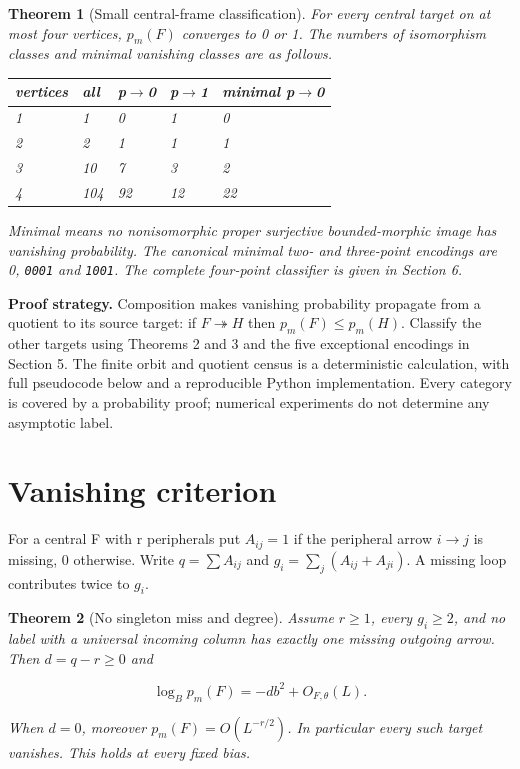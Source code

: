 \documentclass[11pt]{article}
\newtheorem{theorem}{Theorem}
\begin{document}
\begin{theorem}[Small central-frame classification]\label{thm:classification} For every central target on at most four vertices, $p_{m}(F)$ converges to 0 or 1. The numbers of isomorphism classes and minimal vanishing classes are as follows.

\begin{center}\small
\begin{tabular}{lllll}
\toprule
vertices & all & p\ensuremath{\to}0 & p\ensuremath{\to}1 & minimal p\ensuremath{\to}0\\
\midrule
1 & 1 & 0 & 1 & 0\\
2 & 2 & 1 & 1 & 1\\
3 & 10 & 7 & 3 & 2\\
4 & 104 & 92 & 12 & 22\\
\bottomrule
\end{tabular}
\end{center}

Minimal means no nonisomorphic proper surjective bounded-morphic image has vanishing probability. The canonical minimal two- and three-point encodings are 0, \texttt{0001} and \texttt{1001}. The complete four-point classifier is given in Section 6.

\end{theorem}

\noindent\textbf{Proof strategy.} Composition makes vanishing probability propagate from a quotient to its source target: if $F \twoheadrightarrow  H$ then $p_{m}(F)\leq p_{m}(H)$. Classify the other targets using Theorems 2 and 3 and the five exceptional encodings in Section 5. The finite orbit and quotient census is a deterministic calculation, with full pseudocode below and a reproducible Python implementation. Every category is covered by a probability proof; numerical experiments do not determine any asymptotic label.

\section{Vanishing criterion}

For a central F with r peripherals put $A_{ij}=1$ if the peripheral arrow $i\to j$ is missing, 0 otherwise. Write $q=\sum  A_{ij}$ and $g_i=\sum_j(A_{ij}+A_{ji})$. A missing loop contributes twice to $g_{i}$.

\begin{theorem}[No singleton miss and degree]\label{thm:degree}
Assume $r\geq1$, every $g_{i}\geq 2$, and no label with a universal incoming column has exactly one missing outgoing arrow. Then $d=q-r\geq 0$ and

\[
\log_B p_m(F)=-db^2+O_{F,\theta}(L).
\]

When $d=0$, moreover $p_{m}(F)=O(L^{-r/2})$. In particular every such target vanishes. This holds at every fixed bias.
\end{theorem}
\end{document}
